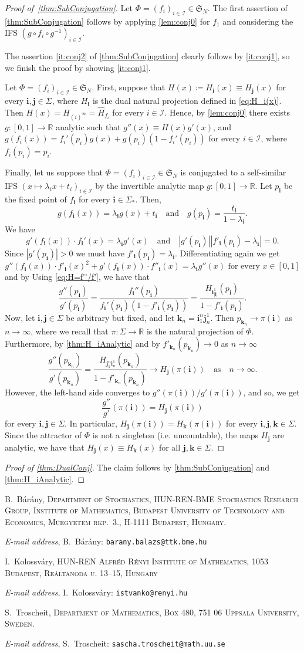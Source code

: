 \documentclass[11pt,]{article}
\makeatletter
\def\cref#1{\ref{#1}}%
\theoremstyle{definition}
\theoremstyle{remark}
\newcommand{\0}{\mathbf{0}}
\newcommand{\bi}{\mathbf{i}}
\newcommand{\bj}{\mathbf{j}}
\newcommand{\bk}{{\mathbf{k}}}
\newcommand{\Addresses}{{%
  \bigskip
  \footnotesize

  B.~B\'ar\'any, \textsc{Department of Stochastics, HUN-REN-BME Stochastics Research Group,
  Institute of Mathematics, Budapest University of Technology and Economics, M\H{u}egyetem rkp.~3.,
H-1111 Budapest, Hungary.}\par\nopagebreak
  \textit{E-mail address}, B.~B\'ar\'any: \texttt{barany.balazs@ttk.bme.hu}

  \medskip

  I.~Kolossv\'ary, \textsc{HUN-REN Alfr\'ed R\'enyi Institute of Mathematics, 1053 Budapest, Re\'altanoda u.
13–15, Hungary}\par\nopagebreak
  \textit{E-mail address}, I.~Kolossv\'ary: \texttt{istvanko@renyi.hu}
   \medskip


  S.~Troscheit, \textsc{Department of Mathematics, Box 480, 751 06 Uppsala University, Sweden.}\par\nopagebreak
  \textit{E-mail address}, S.~Troscheit: \texttt{sascha.troscheit@math.uu.se}
}}
\makeatother
\begin{document}
\begin{proof}[Proof of~\cref{thm:SubConjugation}]
	Let $\Phi=(f_i)_{i\in\mathcal{I}}\in\mathfrak{S}_N$. The first assertion of \cref{thm:SubConjugation} follows by applying \cref{lem:conj0} for $f_1$ and considering the IFS $(g\circ f_i\circ g^{-1})_{i\in\mathcal{I}}$.
	
	The assertion \cref{it:conj2} of \cref{thm:SubConjugation} clearly follows by \cref{it:conj1}, so we finish the proof by showing \cref{it:conj1}.
	
	Let $\Phi=(f_i)_{i\in\mathcal{I}}\in\mathfrak{S}_N$. First, suppose that $H(x)\coloneqq H_{\bi}(x)\equiv H_{\bj}(x)$ for every $\bi,\bj\in\Sigma$, where $H_{\bi}$ is the dual natural projection defined in \cref{eq:H_i(x)}. Then $H(x)=H_{(i)^{\infty}}=\hat{H}_{f_i}$ for every $i\in\mathcal{I}$. Hence, by \cref{lem:conj0} there exists $g\colon[0,1]\to\mathbb{R}$ analytic such that $g''(x)\equiv H(x)g'(x)$, and $g(f_i(x))=f_i'(p_i)g(x)+g(p_i)(1-f_i'(p_i))$ for every $i\in\mathcal{I}$, where $f_i(p_i)=p_i$.
	
	Finally, let us suppose that $\Phi=(f_i)_{i\in\mathcal{I}}\in\mathfrak{S}_N$ is conjugated to a self-similar IFS $(x\mapsto \lambda_ix+t_i)_{i\in\mathcal{I}}$ by the invertible analytic map $g\colon[0,1]\to\mathbb{R}$. Let $p_{\bi}$ be the fixed point of $f_{\bi}$ for every $\bi\in\Sigma_*$. 
	Then,
\[
g(f_{\bi}(x)) = \lambda_{\bi} g(x) + t_{\bi}
\quad\text{and}\quad
g(p_{\bi}) = \frac{t_{\bi}}{1-\lambda_{\bi}}.
\]
We have
\[
g'(f_{\bi}(x))\cdot f_{\bi}'(x) = \lambda_{\bi} g'(x)
\quad\text{and}\quad
|g'(p_{\bi})||f'_{\bi}(p_{\bi})-\lambda_{\bi}| = 0.
\]
Since $|g'(p_{\bi})|>0$ we must have $f'_{\bi}(p_{\bi}) = \lambda_{\bi}$.
Differentiating again we get
\[
g''(f_{\bi}(x))\cdot f'_{\bi}(x)^2 +g'(f_{\bi}(x))\cdot f''_{\bi}(x) = \lambda_{\bi} g''(x)\text{ for every }x\in[0,1]
\]
and by Using \cref{eq:H=f''/f'}, we have that
\[
\frac{g''(p_{\bi})}{g'(p_{\bi})} =
\frac{f_{\bi}''(p_{\bi})}{f_{\bi}'(p_{\bi})(1-f'_{\bi}(p_{\bi}))}
=\frac{H_{\bi_{|\bi|}^1}(p_{\bi})}{1-f'_{\bi}(p_{\bi})}.
\]
Now, let $\bi,\bj\in\Sigma$ be arbitrary but fixed, and let $\bk_n = \bi_1^{n} \bj_n^1$. Then $p_{\bk_n}\to \pi(\bi)$ as $n\to\infty$, where we recall that $\pi\colon\Sigma\to\mathbb{R}$ is the natural projection of $\Phi$. Furthermore, by \cref{thm:H_iAnalytic} and by $f'_{\bk_n}(p_{\bk_n})\to0$ as $n\to\infty$
\[
\frac{g''(p_{\bk_n})}{g'(p_{\bk_n})}
=\frac{H_{\bj_1^n \bi_n^1}(p_{\bk_n})}{1-f'_{\bk_n}(p_{\bk_n})}
\to
H_{\bj}(\pi(\bi))\quad \text{as}\quad n\to\infty.
\]
However, the left-hand side converges to $g''(\pi(\bi))/g'(\pi(\bi))$, and so, we get 
$$
\frac{g''}{g'}(\pi(\bi))=H_{\bj}(\pi(\bi))
$$
for every $\bi,\bj\in\Sigma$. In particular, $H_{\bj}(\pi(\bi))=H_{\bk}(\pi(\bi))$ for every $\bi,\bj,\bk\in\Sigma$. Since the attractor of $\Phi$ is not a singleton (i.e. uncountable), the maps $H_{\bj}$ are analytic, we have that $H_{\bj}(x)\equiv H_{\bk}(x)$ for all $\bj,\bk\in \Sigma$.
\end{proof}

\begin{proof}[Proof of \cref{thm:DualConj}]
	The claim follows by \cref{thm:SubConjugation} and \cref{thm:H_iAnalytic}.
\end{proof}






\Addresses
\end{document}
